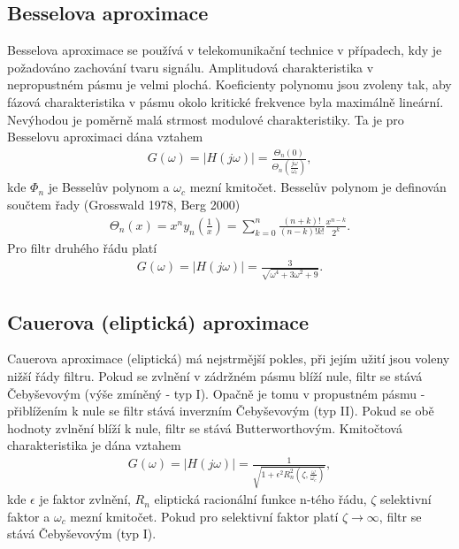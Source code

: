\documentclass[twoside]{article}
\begin{document}
\subsection{Besselova aproximace}
Besselova aproximace se používá v telekomunikační technice v případech, kdy je požadováno zachování tvaru signálu. Amplitudová charakteristika v nepropustném pásmu je velmi plochá. Koeficienty polynomu jsou zvoleny tak, aby fázová charakteristika v pásmu okolo kritické frekvence byla maximálně lineární. Nevýhodou je poměrně malá strmost modulové charakteristiky. Ta je pro Besselovu aproximaci dána vztahem
\begin{align}
G(\omega) = |H(j\omega)| = \frac{\Theta _n(0)}{\Theta _n(\frac{j\omega}{\omega _c})},
\end{align}
kde $\Phi _n$ je Besselův polynom a $\omega _c$ mezní kmitočet. Besselův polynom je definován součtem řady (Grosswald 1978, Berg 2000)
\begin{align}
\Theta _n (x) = x^n y_n (\frac{1}{x}) = \sum_{k=0}^{n}\frac{(n+k)!}{(n-k)!k!}\frac{x^{n-k}}{2^k}.
\end{align}
Pro filtr druhého řádu platí
\begin{align}
G(\omega) = |H(j\omega)| = \frac{3}{\sqrt{\omega ^4 + 3\omega ^2 + 9}}.
\end{align}
\subsection{Cauerova (eliptická) aproximace}
\noindent Cauerova aproximace (eliptická) má nejstrmější pokles, při jejím užití jsou voleny nižší řády filtru. Pokud se zvlnění v zádržném pásmu blíží nule, filtr se stává Čebyševovým (výše zmíněný - typ I). Opačně je tomu v propustném pásmu - přiblížením k nule se filtr stává inverzním Čebyševovým (typ II).  Pokud se obě hodnoty zvlnění blíží k nule, filtr se stává Butterworthovým. Kmitočtová charakteristika je dána vztahem
\begin{align}
G(\omega) = |H(j\omega)| = \frac{1}{\sqrt{1 + \epsilon ^2 R_n ^2(\zeta, \frac{\omega}{\omega _c})}},
\end{align}
kde $\epsilon$ je faktor zvlnění, $R_n$ eliptická racionální funkce n-tého řádu, $\zeta$ selektivní faktor a $\omega _c$ mezní kmitočet. Pokud pro selektivní faktor platí $\zeta \rightarrow \infty$, filtr se stává Čebyševovým (typ I). 
\end{document}
